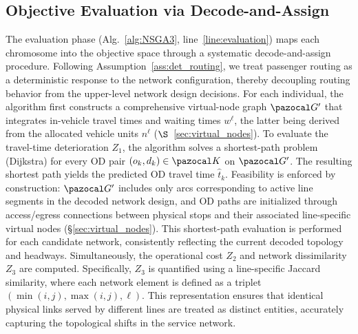 \documentclass[a4paper,fleqn]{cas-sc}
\begin{document}
\subsection{Objective Evaluation via Decode-and-Assign}
\label{sec:evaluation}
The evaluation phase (Alg.~\ref{alg:NSGA3}, line~\ref{line:evaluation}) maps each chromosome into the objective space through a systematic decode-and-assign procedure. Following Assumption~\ref{ass:det_routing}, we treat passenger routing as a deterministic response to the network configuration, thereby decoupling routing behavior from the upper-level network design decisions. 
%
For each individual, the algorithm first constructs a comprehensive virtual-node graph $\pazocal G'$ that integrates in-vehicle travel times and waiting times $w^\ell$, the latter being derived from the allocated vehicle units $n^\ell$ ($\S$~\ref{sec:virtual_nodes}).
%
To evaluate the travel-time deterioration $Z_1$, the algorithm solves a shortest-path problem (Dijkstra) for every OD pair $(o_k, d_k) \in \pazocal K$ on $\pazocal G'$. The resulting shortest path yields the predicted OD travel time $\hat t_k$. Feasibility is enforced by construction: $\pazocal G'$ includes only arcs corresponding to active line segments in the decoded network design, and OD paths are initialized through access/egress connections between physical stops and their associated line-specific virtual nodes (\S\ref{sec:virtual_nodes}).
%
This shortest-path evaluation is performed for each candidate network, consistently reflecting the current decoded topology and headways.
%
Simultaneously, the operational cost $Z_2$ and network dissimilarity $Z_3$ are computed. Specifically, $Z_3$ is quantified using a line-specific Jaccard similarity, where each network element is defined as a triplet $(\min(i,j), \max(i,j), \ell)$. This representation ensures that identical physical links served by different lines are treated as distinct entities, accurately capturing the topological shifts in the service network.
\end{document}
